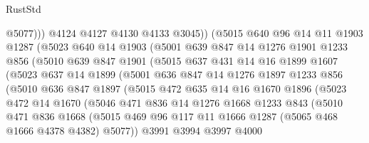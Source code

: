 \begin{lexlean}{RustStd}
\begin{coremodule}
                    @5077)))
              @4124
              @4127
              @4130
              @4133
              @3045))
          (@5015
            @640
            @96
            @14
            @11
            @1903
            @1287
            (@5023
              @640
              @14
              @1903
              (@5001
                @639
                @847
                @14
                @1276
                @1901
                @1233
                @856
                (@5010
                  @639
                  @847
                  @1901
                  (@5015
                    @637
                    @431
                    @14
                    @16
                    @1899
                    @1607
                    (@5023
                      @637
                      @14
                      @1899
                      (@5001
                        @636
                        @847
                        @14
                        @1276
                        @1897
                        @1233
                        @856
                        (@5010
                          @636
                          @847
                          @1897
                          (@5015
                            @472
                            @635
                            @14
                            @16
                            @1670
                            @1896
                            (@5023
                              @472
                              @14
                              @1670
                              (@5046
                                @471
                                @836
                                @14
                                @1276
                                @1668
                                @1233
                                @843
                                (@5010
                                  @471
                                  @836
                                  @1668
                                  (@5015
                                    @469
                                    @96
                                    @117
                                    @11
                                    @1666
                                    @1287
                                    (@5065 @468 @1666 @4378 @4382)
                                    @5077))
                                @3991
                                @3994
                                @3997
                                @4000

\end{coremodule}
\end{lexlean}
